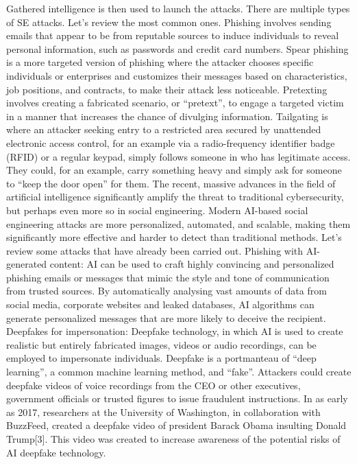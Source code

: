 Gathered intelligence is then used to launch the attacks. There are multiple types of SE attacks. Let’s review the most common ones.
Phishing involves sending emails that appear to be from reputable sources to induce individuals to reveal personal information, such as passwords and credit card numbers. 
Spear phishing is a more targeted version of phishing where the attacker chooses specific individuals or enterprises and customizes their messages based on characteristics, job positions, and contracts, to make their attack less noticeable.
Pretexting involves creating a fabricated scenario, or “pretext”, to engage a targeted victim in a manner that increases the chance of divulging information.
Tailgating is where an attacker seeking entry to a restricted area secured by unattended electronic access control, for an example via a radio-frequency identifier badge (RFID) or a regular keypad, simply follows someone in who has legitimate access. They could, for an example, carry something heavy and simply ask for someone to “keep the door open” for them.
The recent, massive advances in the field of artificial intelligence significantly amplify the threat to traditional cybersecurity, but perhaps even more so in social engineering. Modern AI-based social engineering attacks are more personalized, automated, and scalable, making them significantly more effective and harder to detect than traditional methods. Let’s review some attacks that have already been carried out.
Phishing with AI-generated content: AI can be used to craft highly convincing and personalized phishing emails or messages that mimic the style and tone of communication from trusted sources. By automatically analysing vast amounts of data from social media, corporate websites and leaked databases, AI algorithms can generate personalized messages that are more likely to deceive the recipient.
Deepfakes for impersonation: Deepfake technology, in which AI is used to create realistic but entirely fabricated images, videos or audio recordings, can be employed to impersonate individuals. Deepfake is a portmanteau of “deep learning”, a common machine learning method, and “fake”. Attackers could create deepfake videos of voice recordings from the CEO or other executives, government officials or trusted figures to issue fraudulent instructions. In as early as 2017, researchers at the University of Washington, in collaboration with BuzzFeed, created a deepfake video of president Barack Obama insulting Donald Trump[3]. This video was created to increase awareness of the potential risks of AI deepfake technology.
